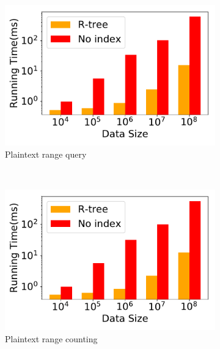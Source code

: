 \begin{figure}[t]
    \centering
    \begin{subfigure}{0.32\textwidth}
        \centering
        \includegraphics[width=\textwidth]{apdx/range_query_index.pdf}
        \caption{Plaintext range query}
        \label{fig:plain-range-query}
    \end{subfigure}
    ~
    \begin{subfigure}{0.32\textwidth}
        \centering
        \includegraphics[width=\textwidth]{apdx/range_count_index.pdf}
        \caption{Plaintext range counting}
        \label{fig:plain-range-counting}
    \end{subfigure}
    ~
    \begin{subfigure}{0.32\textwidth}
        \centering

\end{subfigure}
\end{figure}
